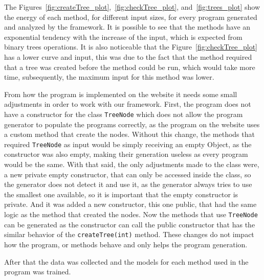 {\color{blue}
  The Figures~\ref{fig:createTree_plot},~\ref{fig:checkTree_plot}, and~\ref{fig:trees_plot} show the energy of each method, for different input sizes, for every program generated and analyzed by the framework. It is possible to see that the methods have an exponential tendency with the increase of the input, which is expected from binary trees operations. It is also noticeable that the Figure~\ref{fig:checkTree_plot} has a lower curve and input, this was due to the fact that the method required that a tree was created before the method could be run, which would take more time, subsequently, the maximum input for this method was lower. 


From how the program is implemented on the website it needs some small adjustments in order to work with our framework. First, the program does not have a constructor for the class \texttt{TreeNode} which does not allow the program generator to populate the programs correctly, as the program on the website uses a custom method that create the nodes. Without this change, the methods that required \texttt{TreeNode} as input would be simply receiving an empty Object, as the constructor was also empty, making their generation useless as every program would be the same.
With that said, the only adjustments made to the class were, a new private empty constructor, that can only be accessed inside the class, so the generator does not detect it and use it, as the generator always tries to use the smallest one available, so it is important that the empty constructor is private. And it was added a new constructor, this one public, that had the same logic as the method that created the nodes. Now the methods that use \texttt{TreeNode} can be generated as the constructor can call the public constructor that has the similar behavior of the \texttt{createTree(int)} method. These changes do not impact how the program, or methods behave and only helps the program generation.

After that the data was collected and the models for each method used in the program was trained.
}

